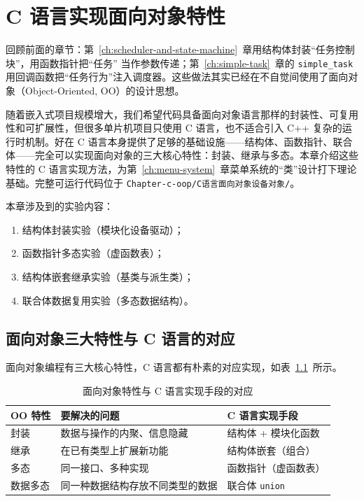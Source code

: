 \chapter{C 语言实现面向对象特性} \label{ch:oop-in-c}

回顾前面的章节：第~\ref{ch:scheduler-and-state-machine}~章用结构体封装“任务控制块”，用函数指针把“任务” 当作参数传递；第~\ref{ch:simple-task}~章的 \texttt{simple\_task} 用回调函数把“任务行为”注入调度器。这些做法其实已经在不自觉间使用了面向对象（Object-Oriented, OO）的设计思想。

随着嵌入式项目规模增大，我们希望代码具备面向对象语言那样的封装性、可复用性和可扩展性，但很多单片机项目只使用 C 语言，也不适合引入 C++ 复杂的运行时机制。好在 C 语言本身提供了足够的基础设施——结构体、函数指针、联合体——完全可以实现面向对象的三大核心特性：封装、继承与多态。本章介绍这些特性的 C 语言实现方法，为第~\ref{ch:menu-system}~章菜单系统的“类”设计打下理论基础。完整可运行代码位于 \texttt{Chapter-c-oop/C语言面向对象设备对象/}。

\medskip 本章涉及到的实验内容：
\begin{enumerate}
\item 结构体封装实验（模块化设备驱动）；
\item 函数指针多态实验（虚函数表）；
\item 结构体嵌套继承实验（基类与派生类）；
\item 联合体数据复用实验（多态数据结构）。
\end{enumerate}

\section{面向对象三大特性与 C 语言的对应}

面向对象编程有三大核心特性，C 语言都有朴素的对应实现，如表~\ref{tab:oop-map}~所示。

\begin{table}[htbp]
\centering \caption{面向对象特性与 C 语言实现手段的对应} \label{tab:oop-map}
	\begin{tabular}{lll}
		\toprule
		OO 特性 & 要解决的问题 & C 语言实现手段 \\
		\midrule
		封装    & 数据与操作的内聚、信息隐藏 & 结构体 + 模块化函数 \\
		继承    & 在已有类型上扩展新功能 & 结构体嵌套（组合） \\
		多态    & 同一接口、多种实现 & 函数指针（虚函数表） \\
		数据多态 & 同一种数据结构存放不同类型的数据 & 联合体 \texttt{union} \\
		\bottomrule
	\end{tabular}
\end{table}

